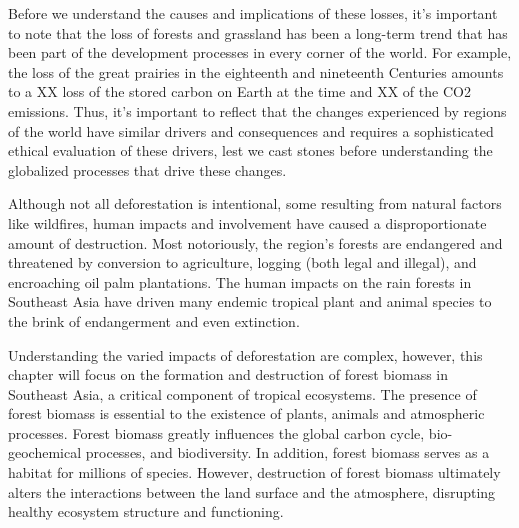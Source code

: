 Before we understand the causes and implications of these losses, it's important to note that the loss of forests and grassland has been a long-term trend that has been part of the development processes in every corner of the world. For example, the loss of the great prairies in the eighteenth and nineteenth Centuries amounts to a XX loss of the stored carbon on Earth at the time and XX of the CO2 emissions. Thus, it's important to reflect that the changes experienced by regions of the world have similar drivers and consequences and requires a sophisticated ethical evaluation of these drivers, lest we cast stones before understanding the globalized processes that drive these changes. 


Although not all deforestation is intentional, some resulting from natural factors like wildfires, human impacts and involvement have caused a disproportionate amount of destruction. Most notoriously, the region's forests are endangered and threatened by conversion to agriculture, logging (both legal and illegal), and encroaching oil palm plantations. The human impacts on the rain forests in Southeast Asia have driven many endemic tropical plant and animal species to the brink of endangerment and even extinction. 
 
Understanding the varied impacts of deforestation are complex, however, this chapter will focus on the formation and destruction of forest biomass in Southeast Asia, a critical component of tropical ecosystems. The presence of forest biomass is essential to the existence of plants, animals and atmospheric processes. Forest biomass greatly influences the global carbon cycle, bio-geochemical processes, and biodiversity.  In addition, forest biomass serves as a habitat for millions of species. However, destruction of forest biomass ultimately alters the interactions between the land surface and the atmosphere, disrupting healthy ecosystem structure and functioning. 




